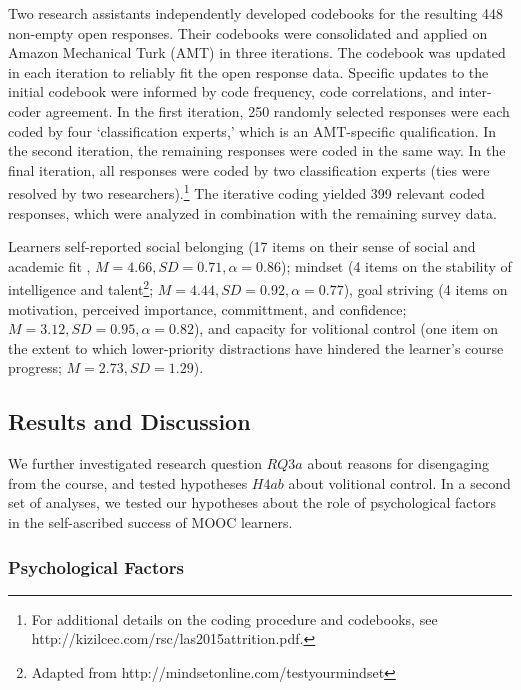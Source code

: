 \documentclass{sigchi}\usepackage[]{graphicx}\usepackage[]{color}
\begin{document}
Two research assistants independently developed codebooks for the resulting 448 non-empty open responses. Their codebooks were consolidated and applied on Amazon Mechanical Turk (AMT) in three iterations. The codebook was updated in each iteration to reliably fit the open response data. Specific updates to the initial codebook were informed by code frequency, code correlations, and inter-coder agreement. In the first iteration, 250 randomly selected responses were each coded by four `classification experts,' which is an AMT-specific qualification. In the second iteration, the remaining responses were coded in the same way. In the final iteration, all responses were coded by two classification experts (ties were resolved by two researchers).\footnote{For additional details on the coding procedure and codebooks, see http://kizilcec.com/rsc/las2015attrition.pdf.} The iterative coding yielded 399 relevant coded responses, which were analyzed in combination with the remaining survey data.

Learners self-reported social belonging (17 items on their sense of social and academic fit \cite{walton2007question}, $M=4.66, SD=0.71, \alpha=0.86$); mindset (4 items on the stability of intelligence and talent\footnote{Adapted from http://mindsetonline.com/testyourmindset}; $M=4.44, SD=0.92, \alpha=0.77$), goal striving (4 items on motivation, perceived importance, committment, and confidence; $M=3.12, SD=0.95, \alpha=0.82$), and capacity for volitional control (one item on the extent to which lower-priority distractions have hindered the learner's course progress; $M=2.73, SD=1.29$).

\subsection{Results and Discussion}

We further investigated research question $RQ3a$ about reasons for disengaging from the course, and tested hypotheses $H4ab$ about volitional control. In a second set of analyses, we tested our hypotheses about the role of psychological factors in the self-ascribed success of MOOC learners.
\\
\subsubsection{Psychological Factors}
\end{document}
